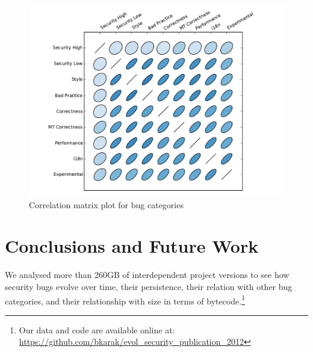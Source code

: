 \documentclass{sig-alternate}
\begin{document}
%    

\begin{figure}[t]
  \centering
  \includegraphics[scale=0.47]{corrplot.pdf}
  \caption{Correlation matrix plot for bug categories}
  \label{fig:corrplot}
\end{figure}

\section{Conclusions and Future Work}
\label{sec:con}

We analysed more than 260GB of interdependent project versions to see
how security bugs evolve over time, their persistence, their relation
with other bug categories, and their relationship with size in terms
of bytecode.\footnote{Our data and code are available online at:
\url{https://github.com/bkarak/evol_security_publication_2012}}
\end{document}
